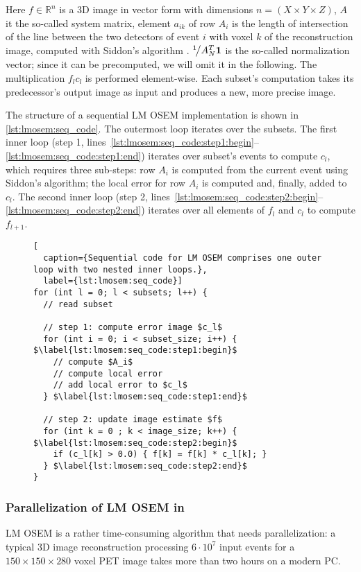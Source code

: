 Here $f \in \mathbb{R}^n$ is a 3D image in vector form with dimensions $n = (X \times Y \times Z)$, $A$ it the so-called system matrix, element $a_{ik}$ of row $A_i$ is the length of intersection of the line between the two detectors of event $i$ with voxel $k$ of the reconstruction image, computed with Siddon's algorithm \cite{Siddon1985}.
${}^{1}\!\big/{A_N^T \textbf{1}}$ is the so-called normalization vector; since it can be precomputed, we will omit it in the following.
The multiplication $f_{l}c_{l}$ is performed element-wise.
Each subset's computation takes its predecessor's output image as input and produces a new, more precise image.

The structure of a sequential LM OSEM implementation is shown in \autoref{lst:lmosem:seq_code}.
The outermost loop iterates over the subsets.
The first inner loop (step 1, lines~\autoref{lst:lmosem:seq_code:step1:begin}--\autoref{lst:lmosem:seq_code:step1:end}) iterates over subset's events to compute $c_l$, which requires three sub-steps:
row $A_i$ is computed from the current event using Siddon's algorithm;
the local error for row $A_i$ is computed and, finally, added to $c_l$.
The second inner loop (step 2, lines~\autoref{lst:lmosem:seq_code:step2:begin}--\autoref{lst:lmosem:seq_code:step2:end}) iterates over all elements of $f_l$ and $c_l$ to compute $f_{l+1}$.
\begin{figure}
\begin{lstlisting}[
  caption={Sequential code for LM OSEM comprises one outer loop with two nested inner loops.},
  label={lst:lmosem:seq_code}]
for (int l = 0; l < subsets; l++) {
  // read subset

  // step 1: compute error image $c_l$
  for (int i = 0; i < subset_size; i++) { $\label{lst:lmosem:seq_code:step1:begin}$
    // compute $A_i$
    // compute local error
    // add local error to $c_l$
  } $\label{lst:lmosem:seq_code:step1:end}$

  // step 2: update image estimate $f$
  for (int k = 0 ; k < image_size; k++) { $\label{lst:lmosem:seq_code:step2:begin}$
    if (c_l[k] > 0.0) { f[k] = f[k] * c_l[k]; }
  } $\label{lst:lmosem:seq_code:step2:end}$
}
\end{lstlisting}
\end{figure}

\subsubsection{Parallelization of LM OSEM in \OpenCL}
\label{sec:parallel_implementation}
LM OSEM is a rather time-consuming algorithm that needs parallelization:
a typical 3D image reconstruction processing $6 \cdot 10^7$ input events for a $150 \times 150 \times 280$ voxel PET image takes more than two hours on a modern PC.

